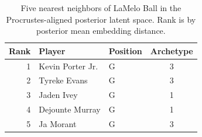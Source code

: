 \begin{table}[htbp]
  \centering\small
  \begin{tabular}{rllc}
    \toprule
    Rank & Player & Position & Archetype \\
    \midrule
    1 & Kevin Porter Jr. & G & 3 \\
    2 & Tyreke Evans & G & 3 \\
    3 & Jaden Ivey & G & 1 \\
    4 & Dejounte Murray & G & 1 \\
    5 & Ja Morant & G & 3 \\
    \bottomrule
  \end{tabular}
  \caption{Five nearest neighbors of LaMelo Ball in the Procrustes-aligned posterior latent space. Rank is by posterior mean embedding distance.}
  \label{tab:LaMelo_Ball_neighbors}
\end{table}

